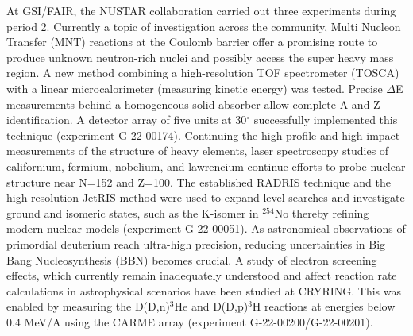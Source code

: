 At GSI/FAIR, the NUSTAR collaboration carried out three experiments during period 2. Currently a topic of investigation across the community, Multi Nucleon Transfer (MNT) reactions at the Coulomb barrier offer a promising route to produce unknown neutron-rich nuclei and possibly access the super heavy mass region. A new method combining a high-resolution TOF spectrometer (TOSCA) with a linear microcalorimeter (measuring kinetic energy) was tested. Precise $\Delta$E measurements behind a homogeneous solid absorber allow complete A and Z identification. A detector array of five units at 30$^{\circ}$ successfully implemented this technique (experiment G-22-00174). Continuing the high profile and high impact measurements of the structure of heavy elements, laser spectroscopy studies of californium, fermium, nobelium, and lawrencium continue efforts to probe nuclear structure near N=152 and Z=100. The established RADRIS technique and the high-resolution JetRIS method were used to expand level searches and investigate ground and isomeric states, such as the K-isomer in $^{254}$No thereby refining modern nuclear models (experiment G-22-00051). As astronomical observations of primordial deuterium reach ultra-high precision, reducing uncertainties in Big Bang Nucleosynthesis (BBN) becomes crucial. A study of electron screening effects, which currently remain inadequately understood and affect reaction rate calculations in astrophysical scenarios have been studied at CRYRING. This was enabled by measuring the D(D,n)$^3$He and D(D,p)$^3$H reactions at energies below 0.4 MeV/A using the CARME array (experiment G-22-00200/G-22-00201).


